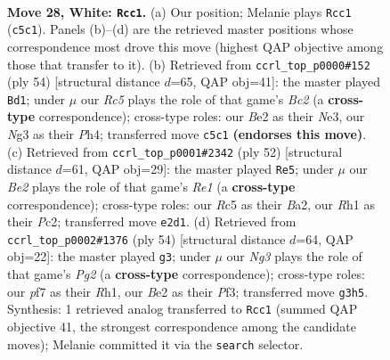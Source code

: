 \documentclass[11pt]{article}
\begin{document}
\clearpage

\begin{figure}[p]\centering
\begin{subfigure}{0.46\textwidth}\centering
\resizebox{\linewidth}{!}{%
\newchessgame
\chessboard[
  setfen={r4kr1/1p3p1p/p3b1p1/2Rp4/8/3K1PN1/PP2B1PP/7R w - - 1 28},
  showmover=false,
  pgfstyle=straightmove, color=movearrow, markmove={c5-c1}
]}
\caption{}
\end{subfigure}\hfill
\begin{subfigure}{0.46\textwidth}\centering
\resizebox{\linewidth}{!}{%
\newchessgame
\chessboard[
  setfen={4r3/2rn1pkp/2b3p1/1p6/3Rp2P/2P1N3/1PB2PP1/R5K1 w - - 3 28},
  showmover=false,
  pgfstyle=straightmove, color=movearrow, markmove={c2-d1}
]}
\caption{}
\end{subfigure}
\\[4pt]
\begin{subfigure}{0.46\textwidth}\centering
\resizebox{\linewidth}{!}{%
\newchessgame
\chessboard[
  setfen={2r3k1/p4p1p/1r2p1p1/1b6/2pR4/P4PP1/BPP4P/2K1R3 w - - 4 27},
  showmover=false,
  pgfstyle=straightmove, color=movearrow, markmove={e1-e5}
]}
\caption{}
\end{subfigure}\hfill
\begin{subfigure}{0.46\textwidth}\centering
\resizebox{\linewidth}{!}{%
\newchessgame
\chessboard[
  setfen={4r3/p1r2pk1/2pR2p1/4p2p/P3Nb1P/1P3P2/2P3P1/1K5R w - - 5 28},
  showmover=false,
  pgfstyle=straightmove, color=movearrow, markmove={g2-g3}
]}
\caption{}
\end{subfigure}
\caption{\textbf{Move 28, White: \texttt{Rcc1}.} (a) Our position; Melanie plays \texttt{Rcc1} (\texttt{c5c1}). Panels (b)--(d) are the retrieved master positions whose correspondence most drove this move (highest QAP objective among those that transfer to it). (b) Retrieved from \texttt{ccrl\_top\_p0000\#152} (ply 54) [structural distance $d$=65, QAP obj=41]: the master played \texttt{Bd1}; under $\mu$ our \emph{Rc5} plays the role of that game's \emph{Bc2} (a \textbf{cross-type} correspondence); cross-type roles: our \emph{B}e2 as their \emph{N}e3, our \emph{N}g3 as their \emph{P}h4; transferred move \texttt{c5c1} \textbf{(endorses this move)}. (c) Retrieved from \texttt{ccrl\_top\_p0001\#2342} (ply 52) [structural distance $d$=61, QAP obj=29]: the master played \texttt{Re5}; under $\mu$ our \emph{Be2} plays the role of that game's \emph{Re1} (a \textbf{cross-type} correspondence); cross-type roles: our \emph{R}c5 as their \emph{B}a2, our \emph{R}h1 as their \emph{P}c2; transferred move \texttt{e2d1}. (d) Retrieved from \texttt{ccrl\_top\_p0002\#1376} (ply 54) [structural distance $d$=64, QAP obj=22]: the master played \texttt{g3}; under $\mu$ our \emph{Ng3} plays the role of that game's \emph{Pg2} (a \textbf{cross-type} correspondence); cross-type roles: our \emph{p}f7 as their \emph{R}h1, our \emph{B}e2 as their \emph{P}f3; transferred move \texttt{g3h5}. Synthesis: 1 retrieved analog transferred to \texttt{Rcc1} (summed QAP objective 41, the strongest correspondence among the candidate moves); Melanie committed it via the \texttt{search} selector.}
\label{fig:thought-m54}
\end{figure}
\end{document}
